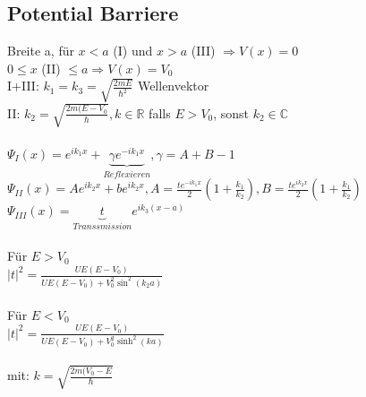 \documentclass[10pt,a4paper]{article}
\begin{document}
\subsection{Potential Barriere}
%
Breite a, für $x<a$ (I) und $x > a$ (III) $\Rightarrow V(x)=0$\\
$0\leq x$ (II) $\leq a \Rightarrow V(x)=V_0$\\
I+III: $k_1=k_3=\sqrt{\frac{2mE}{\hbar^2}}$ Wellenvektor\\
II: $k_2=\sqrt{\frac{2m(E-V_0}{\hbar}}, k \in \mathbb{R}$ falls $E>V_0$, sonst $k_2\in \mathbb{C}$\\
%
\\
$\Psi_I(x)=e^{ik_1x}+\underbrace{\gamma e^{-ik_1x}}_{Reflexieren}, \gamma = A+B-1$\\
$\Psi_{II}(x)=Ae^{ik_2x}+be^{ik_2x},A= \frac{te^{-ik_1x}}{2}(1+\frac{k_1}{k_2}),B=\frac{te^{ik_2x}}{2}(1+\frac{k_1}{k_2})$\\
$\Psi_{III}(x)=\underbrace{t}_{Transsmission}e^{ik_3(x-a)}$\\
%
\\
Für $E > V_0$\\
$|t|^2=\frac{UE(E-V_0)}{UE(E-V_0)+V_0^2\sin^2(k_2a)}$\\
%
\\
Für $E < V_0$\\
$|t|^2=\frac{UE(E-V_0)}{UE(E-V_0)+V_0^2\sinh^2(ka)}$\\
%
\\
mit: $k=\sqrt{\frac{2m(V_0-E}{\hbar}}$
\end{document}
